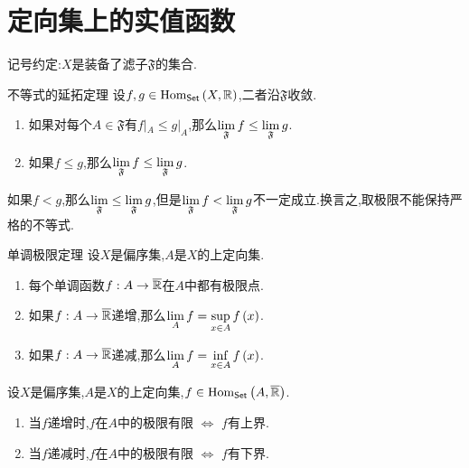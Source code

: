 \section{定向集上的实值函数}

记号约定:$X$是装备了滤子$\mathfrak{F}$的集合.

\begin{theorem}{不等式的延拓定理}{}
	设$f,g\in\operatorname{Hom}_{\mathsf{Set}}\left(X,\mathbb{R}\right)$,二者沿$\mathfrak{F}$收敛.
	\begin{enumerate}
		\item 如果对每个$A\in\mathfrak{F}$有$f|_{A}\leq g|_{A}$,那么$\displaystyle\lim_{\mathfrak{F}}f\leq\displaystyle\lim_{\mathfrak{F}}g$.
		\item 如果$f\leq g$,那么$\displaystyle\lim_{\mathfrak{F}}f\leq\displaystyle\lim_{\mathfrak{F}}g$.
	\end{enumerate}
\end{theorem}

\begin{remark}{}{}
	如果$f<g$,那么$\displaystyle\lim_{\mathfrak{F}}\leq\displaystyle\lim_{\mathfrak{F}}g$,但是$\displaystyle\lim_{\mathfrak{F}}f<\displaystyle\lim_{\mathfrak{F}}g$不一定成立.换言之,取极限不能保持严格的不等式.
\end{remark}

\begin{theorem}{单调极限定理}{}
	设$X$是偏序集,$A$是$X$的上定向集.
	\begin{enumerate}
		\item 每个单调函数$f:A\to\overline{\mathbb{R}}$在$A$中都有极限点.
		\item 如果$f:A\to\overline{\mathbb{R}}$递增,那么$\displaystyle\lim_{A}f=\sup\limits_{x\in A}f\left(x\right)$.
		\item 如果$f:A\to\overline{\mathbb{R}}$递减,那么$\displaystyle\lim_{A}f=\inf\limits_{x\in A}f\left(x\right)$.
	\end{enumerate}
\end{theorem}

\begin{corollary}{}{}
	设$X$是偏序集,$A$是$X$的上定向集,$f\in\operatorname{Hom}_{\mathsf{Set}}\left(A,\overline{\mathbb{R}}\right)$.
	\begin{enumerate}
		\item 当$f$递增时,$f$在$A$中的极限有限 $\iff$ $f$有上界.
		\item 当$f$递减时,$f$在$A$中的极限有限 $\iff$ $f$有下界.
	\end{enumerate}
\end{corollary}

